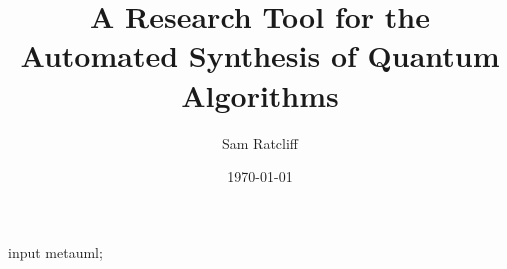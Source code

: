 \documentclass[authoryearcitations]{UoYCSproject}
\author{Sam Ratcliff}
\title{A Research Tool for the Automated Synthesis of Quantum Algorithms}
\date{\today}
\begin{document}
\begin{empfile}
\begin{empcmds}
input metauml;
\end{empcmds}

\maketitle
\listoffigures
\listoftables








% 









\appendix



\end{empfile}
\end{document}
